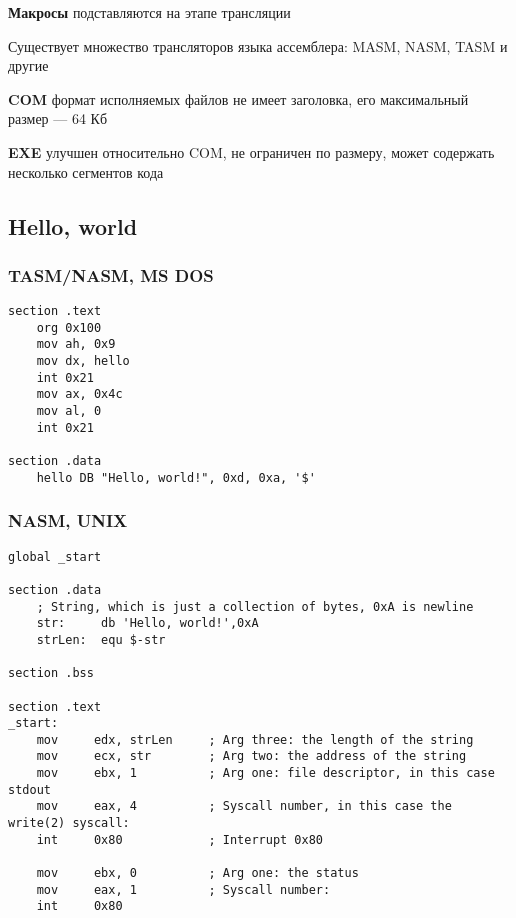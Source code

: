 \documentclass{article}
\begin{document}
\textbf{Макросы} подставляются на этапе трансляции

Существует множество трансляторов языка ассемблера: MASM, NASM, TASM и другие

\hfill

\textbf{COM} формат исполняемых файлов не имеет заголовка, его максимальный размер — 64 Кб

\textbf{EXE} улучшен относительно COM, не ограничен по размеру, может содержать несколько сегментов кода

\pagebreak
\subsection{Hello, world}

\subsubsection{TASM/NASM, MS DOS}

\begin{verbatim}
section .text
	org 0x100
	mov ah, 0x9
	mov dx, hello
	int 0x21
	mov ax, 0x4c
	mov al, 0
	int 0x21

section .data
	hello DB "Hello, world!", 0xd, 0xa, '$'
\end{verbatim}

\subsubsection{NASM, UNIX}

\begin{verbatim}
global _start

section .data
    ; String, which is just a collection of bytes, 0xA is newline
    str:     db 'Hello, world!',0xA
    strLen:  equ $-str

section .bss

section .text
_start:
    mov     edx, strLen     ; Arg three: the length of the string
    mov     ecx, str        ; Arg two: the address of the string
    mov     ebx, 1          ; Arg one: file descriptor, in this case stdout
    mov     eax, 4          ; Syscall number, in this case the write(2) syscall: 
    int     0x80            ; Interrupt 0x80        

    mov     ebx, 0          ; Arg one: the status
    mov     eax, 1          ; Syscall number:
    int     0x80
\end{verbatim}
\end{document}
